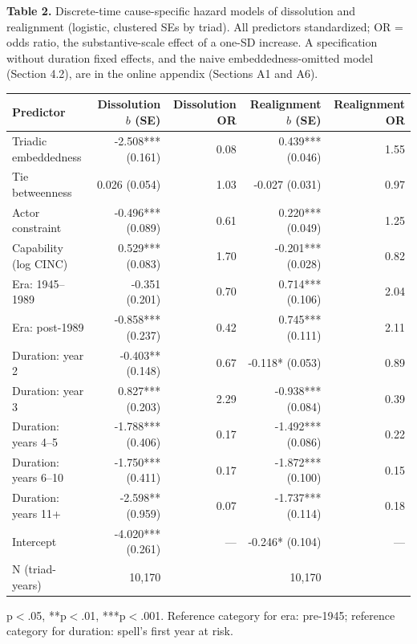 \documentclass[Afour,sageh,times,doublespace]{sagej}
\begin{document}
\begin{table}[t]
\centering
\textbf{Table 2.} Discrete-time cause-specific hazard models of dissolution and realignment (logistic, clustered SEs by triad). All predictors standardized; OR = odds ratio, the substantive-scale effect of a one-SD increase. A specification without duration fixed effects, and the naive embeddedness-omitted model (Section 4.2), are in the online appendix (Sections A1 and A6).

\vspace{4pt}
{\small\sf
\begin{tabular}{lrrrr}
\toprule
Predictor & Dissolution $b$ (SE) & Dissolution OR & Realignment $b$ (SE) & Realignment OR\\
\midrule
Triadic embeddedness & -2.508*** (0.161) & 0.08 & 0.439*** (0.046) & 1.55\\
Tie betweenness & 0.026 (0.054) & 1.03 & -0.027 (0.031) & 0.97\\
Actor constraint & -0.496*** (0.089) & 0.61 & 0.220*** (0.049) & 1.25\\
Capability (log CINC) & 0.529*** (0.083) & 1.70 & -0.201*** (0.028) & 0.82\\
Era: 1945--1989 & -0.351 (0.201) & 0.70 & 0.714*** (0.106) & 2.04\\
Era: post-1989 & -0.858*** (0.237) & 0.42 & 0.745*** (0.111) & 2.11\\
Duration: year 2 & -0.403** (0.148) & 0.67 & -0.118* (0.053) & 0.89\\
Duration: year 3 & 0.827*** (0.203) & 2.29 & -0.938*** (0.084) & 0.39\\
Duration: years 4--5 & -1.788*** (0.406) & 0.17 & -1.492*** (0.086) & 0.22\\
Duration: years 6--10 & -1.750*** (0.411) & 0.17 & -1.872*** (0.100) & 0.15\\
Duration: years 11+ & -2.598** (0.959) & 0.07 & -1.737*** (0.114) & 0.18\\
Intercept & -4.020*** (0.261) & --- & -0.246* (0.104) & ---\\
N (triad-years) & 10,170 & & 10,170 & \\
\bottomrule
\end{tabular}
\par}

\vspace{4pt}
{\small *p$<$.05, **p$<$.01, ***p$<$.001. Reference category for era: pre-1945; reference category for duration: spell's first year at risk.}
\end{table}
\end{document}
